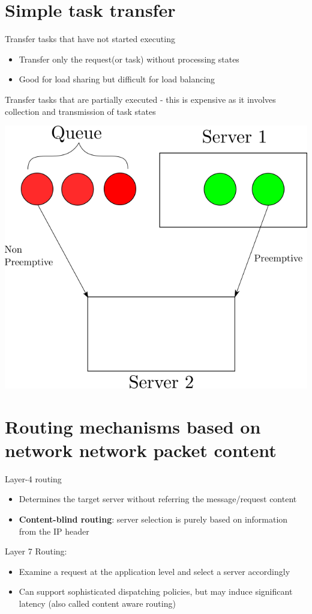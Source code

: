 \documentclass{article}[18pt]
\begin{document}
\section{Simple task transfer}
\begin{definition}
Transfer tasks that have not started executing
\begin{itemize}
	\item Transfer only the request(or task) without processing states
	\item Good for load sharing but difficult for load balancing
\end{itemize}
\end{definition}
\begin{definition}
Transfer tasks that are partially executed - this is expensive as it involves collection and transmission of task states
\end{definition}
\begin{center}
\includegraphics[scale=0.4]{preemptive}
\end{center}
\section{Routing mechanisms based on network network packet content}
Layer-4 routing
\begin{itemize}
	\item Determines the target server without referring the message/request content
	\item \textbf{Content-blind routing}: server selection is purely based on information from the IP header
\end{itemize}
Layer 7 Routing:
\begin{itemize}
	\item Examine a request at the application level and select a server accordingly
	\item Can support sophisticated dispatching policies, but may induce significant latency (also called content aware routing)
\end{itemize}
\end{document}
